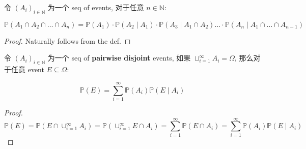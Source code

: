 \begin{proposition}{}

令 \(\left( \mathit{A}_{\mathit{i}} \right)_{\mathit{i} \in \mathbb{N}}\) 为一个 seq of events, 对于任意 \(\mathit{n} \in \mathbb{N}\):

\[\mathbb{P}\left( {\mathit{A}_{1} \cap \mathit{A}_{2} \cap \ldots \cap \mathit{A}_{\mathit{n}}} \right) = \mathbb{P}\left( \mathit{A}_{1} \right) \cdot \mathbb{P}\left( {\mathit{A}_{2} \mid \mathit{A}_{1}} \right) \cdot \mathbb{P}\left( {\mathit{A}_{3} \mid \mathit{A}_{1} \cap \mathit{A}_{2}} \right)\ldots \cdot \mathbb{P}\left( {\mathit{A}_{\mathit{n}} \mid \mathit{A}_{1} \cap \ldots \cap \mathit{A}_{\mathit{n} - 1}} \right)\]

\end{proposition}

\begin{proof}

Naturally follows from the def.

\end{proof}

\begin{theorem}{}

令 \(\left( \mathit{A}_{\mathit{i}} \right)_{\mathit{i} \in \mathbb{N}}\) 为一个 seq of \textbf{pairwise disjoint} events, 如果 \(\sqcup_{\mathit{i} = 1}^{\infty}\mathit{A}_{\mathit{i}} = \Omega\), 那么对于任意 event \(\mathit{E} \subseteq \Omega\):

\[\mathbb{P}(\mathit{E}) = \sum\limits_{\mathit{i} = 1}^{\infty}\mathbb{P}\left( \mathit{A}_{\mathit{i}} \right)\mathbb{P}\left( {\mathit{E} \mid \mathit{A}_{\mathit{i}}} \right)\]

\end{theorem}

\begin{proof}

\[\mathbb{P}(\mathit{E}) = \mathbb{P}\left( {\mathit{E} \cap \cup_{\mathit{i} = 1}^{\infty}\mathit{A}_{\mathit{i}}} \right) = \mathbb{P}\left( {\cup_{\mathit{i} = 1}^{\infty}\mathit{E} \cap \mathit{A}_{\mathit{i}}} \right) = \sum\limits_{\mathit{i} = 1}^{\infty}\mathbb{P}\left( {\mathit{E} \cap \mathit{A}_{\mathit{i}}} \right) = \sum\limits_{\mathit{i} = 1}^{\infty}\mathbb{P}\left( \mathit{A}_{\mathit{i}} \right)\mathbb{P}\left( {\mathit{E} \mid \mathit{A}_{\mathit{i}}} \right)\]

\end{proof}

